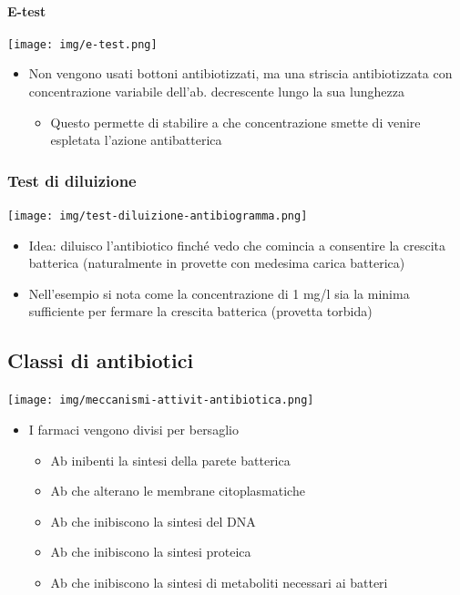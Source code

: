 \documentclass[italian,]{article}
\providecommand{\tightlist}{%
  \setlength{\itemsep}{0pt}\setlength{\parskip}{0pt}}
\begin{document}
\hypertarget{e-test}{%
\paragraph{E-test}\label{e-test}}

\begin{center}
\texttt{[image: img/e-test.png]}
\end{center}

\begin{itemize}
\tightlist
\item
  Non vengono usati bottoni antibiotizzati, ma una striscia
  antibiotizzata con concentrazione variabile dell'ab. decrescente lungo
  la sua lunghezza

  \begin{itemize}
  \tightlist
  \item
    Questo permette di stabilire a che concentrazione smette di venire
    espletata l'azione antibatterica
  \end{itemize}
\end{itemize}

\hypertarget{test-di-diluizione}{%
\subsubsection{Test di diluizione}\label{test-di-diluizione}}

\texttt{[image: img/test-diluizione-antibiogramma.png]}~

\begin{itemize}
\tightlist
\item
  Idea: diluisco l'antibiotico finché vedo che comincia a consentire la
  crescita batterica (naturalmente in provette con medesima carica
  batterica)
\item
  Nell'esempio si nota come la concentrazione di 1 mg/l sia la minima
  sufficiente per fermare la crescita batterica (provetta torbida)
\end{itemize}

\hypertarget{classi-di-antibiotici}{%
\subsection{Classi di antibiotici}\label{classi-di-antibiotici}}

\texttt{[image: img/meccanismi-attivit-antibiotica.png]}~

\begin{itemize}
\tightlist
\item
  I farmaci vengono divisi per bersaglio

  \begin{itemize}
  \tightlist
  \item
    Ab inibenti la sintesi della parete batterica
  \item
    Ab che alterano le membrane citoplasmatiche
  \item
    Ab che inibiscono la sintesi del DNA
  \item
    Ab che inibiscono la sintesi proteica
  \item
    Ab che inibiscono la sintesi di metaboliti necessari ai batteri
  \end{itemize}
\end{itemize}
\end{document}
